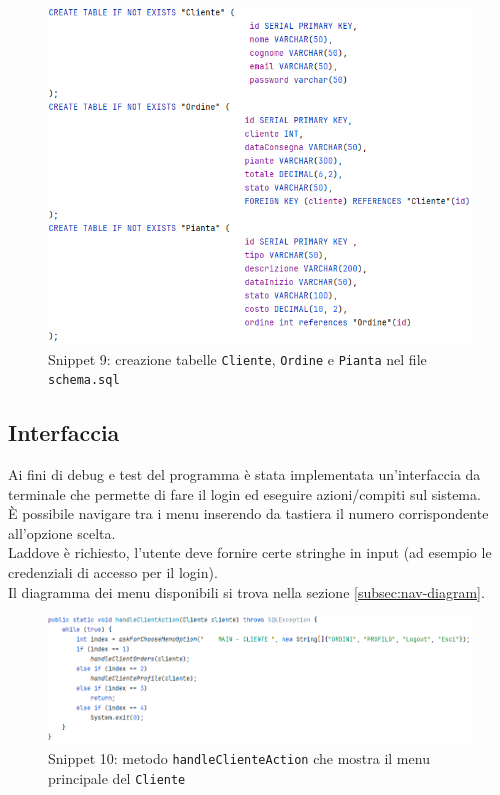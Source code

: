 \documentclass{article}
\newcommand{\code}[1]{\texttt{#1}}
\begin{document}
\begin{figure}[H]
    \centering
    \includegraphics[scale=0.5]{resources/images/Snippets/snippet_createtable.png}
    \captionsetup{labelformat=empty,labelsep=none}
    \caption{Snippet 9: creazione tabelle \code{Cliente}, \code{Ordine} e \code{Pianta} nel file \code{schema.sql}}
    \label{fig:snippet_createtable}
\end{figure}


\subsection{Interfaccia}
Ai fini di debug e test del programma è stata implementata un'interfaccia da terminale che permette di fare il login ed eseguire azioni/compiti sul sistema.\\
È possibile navigare tra i menu inserendo da tastiera il numero corrispondente all'opzione scelta.\\
Laddove è richiesto, l'utente deve fornire certe stringhe in input (ad esempio le credenziali di accesso per il login).\\
Il diagramma dei menu disponibili si trova nella sezione \ref{subsec:nav-diagram}.

\begin{figure}[H]
    \centering
    \includegraphics[scale=0.5]{resources/images/Snippets/snippet_handleclienteaction.png}
    \captionsetup{labelformat=empty,labelsep=none}
    \caption{Snippet 10: metodo \code{handleClienteAction} che mostra il menu principale del \code{Cliente}}
    \label{fig:snippet_handleclienteaction}
\end{figure}
\end{document}
